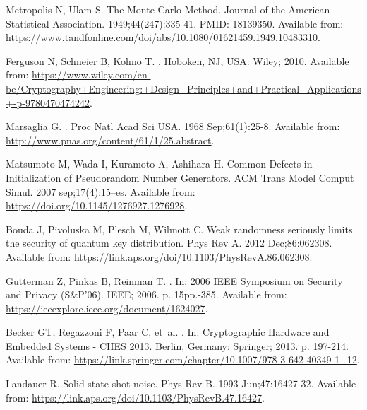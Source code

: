 \documentclass[]{interact}
\theoremstyle{plain}%
\theoremstyle{definition}
\theoremstyle{remark}
\begin{document}
\begin{thebibliography}{100}
Metropolis N, Ulam S.
\newblock The Monte Carlo Method.
\newblock Journal of the American Statistical Association. 1949;44(247):335-41.
\newblock PMID: 18139350.
\newblock Available from:
  \url{https://www.tandfonline.com/doi/abs/10.1080/01621459.1949.10483310}.

Ferguson N, Schneier B, Kohno T.
.
\newblock Hoboken, NJ, USA: Wiley; 2010.
\newblock Available from:
  \url{https://www.wiley.com/en-be/Cryptography+Engineering:+Design+Principles+and+Practical+Applications+-p-9780470474242}.

Marsaglia G.
.
\newblock Proc Natl Acad Sci USA. 1968 Sep;61(1):25-8.
\newblock Available from: \url{http://www.pnas.org/content/61/1/25.abstract}.

Matsumoto M, Wada I, Kuramoto A, Ashihara H.
\newblock Common Defects in Initialization of Pseudorandom Number Generators.
\newblock ACM Trans Model Comput Simul. 2007 sep;17(4):15–es.
\newblock Available from: \url{https://doi.org/10.1145/1276927.1276928}.

Bouda J, Pivoluska M, Plesch M, Wilmott C.
\newblock Weak randomness seriously limits the security of quantum key
  distribution.
\newblock Phys Rev A. 2012 Dec;86:062308.
\newblock Available from:
  \url{https://link.aps.org/doi/10.1103/PhysRevA.86.062308}.

Gutterman Z, Pinkas B, Reinman T.
.
\newblock In: {2006 IEEE Symposium on Security and Privacy (S{\&}P'06)}. IEEE;
  2006. p. 15pp.-385.
\newblock Available from: \url{https://ieeexplore.ieee.org/document/1624027}.

Becker GT, Regazzoni F, Paar C, et~al.
.
\newblock In: {Cryptographic Hardware and Embedded Systems - CHES 2013}.
  Berlin, Germany: Springer; 2013. p. 197-214.
\newblock Available from:
  \url{https://link.springer.com/chapter/10.1007/978-3-642-40349-1_12}.

Landauer R.
\newblock Solid-state shot noise.
\newblock Phys Rev B. 1993 Jun;47:16427-32.
\newblock Available from:
  \url{https://link.aps.org/doi/10.1103/PhysRevB.47.16427}.


\end{thebibliography}
\end{document}
